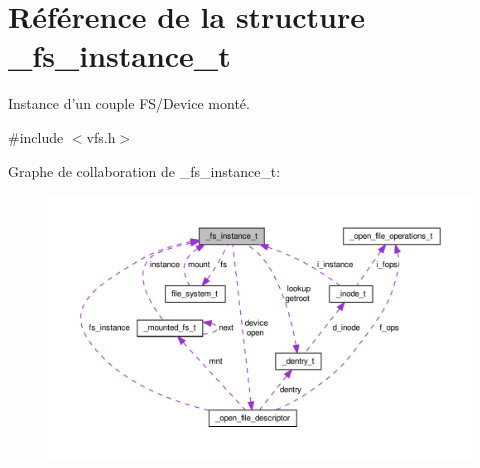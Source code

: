 \hypertarget{struct__fs__instance__t}{\section{\-Référence de la structure \-\_\-fs\-\_\-instance\-\_\-t}
\label{struct__fs__instance__t}
}


\-Instance d'un couple \-F\-S/\-Device monté.  




{\ttfamily \#include $<$vfs.\-h$>$}



\-Graphe de collaboration de \-\_\-fs\-\_\-instance\-\_\-t\-:\nopagebreak
\begin{figure}[H]
\begin{center}
\leavevmode
\includegraphics[width=350pt]{struct__fs__instance__t__coll__graph}
\end{center}
\end{figure}
